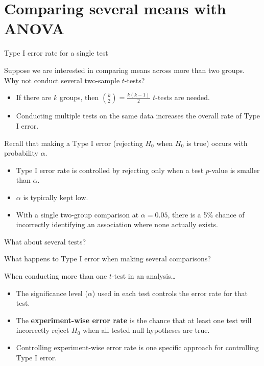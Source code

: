 \documentclass[
  ignorenonframetext,
  aspectratio=169]{beamer}
\begin{document}
\hypertarget{comparing-several-means-with-anova}{%
\section{Comparing several means with
ANOVA}\label{comparing-several-means-with-anova}}

\begin{frame}{Type I error rate for a single test}
\protect\hypertarget{type-i-error-rate-for-a-single-test}{}
\small

Suppose we are interested in comparing means across more than two
groups. Why not conduct several two-sample \(t\)-tests?

\begin{itemize}
\item
  If there are \(k\) groups, then \({k \choose 2} = \frac{k(k-1)}{2}\)
  \(t\)-tests are needed.
\item
  Conducting multiple tests on the same data increases the overall rate
  of Type I error.
\end{itemize}

Recall that making a Type I error (rejecting \(H_0\) when \(H_0\) is
true) occurs with probability \(\alpha\).

\begin{itemize}
\item
  Type I error rate is controlled by rejecting only when a test
  \(p\)-value is smaller than \(\alpha\).
\item
  \(\alpha\) is typically kept low.
\item
  With a single two-group comparison at \(\alpha = 0.05\), there is a
  5\% chance of incorrectly identifying an association where none
  actually exists.
\end{itemize}
\end{frame}

\begin{frame}{What about several tests?}
\protect\hypertarget{what-about-several-tests}{}
\small

What happens to Type I error when making several comparisons?

When conducting more than one \(t\)-test in an analysis\ldots{}

\begin{itemize}
\item
  The significance level (\(\alpha\)) used in each test controls the
  error rate for that test.
\item
  The \textbf{experiment-wise error rate} is the chance that at least
  one test will incorrectly reject \(H_0\) when all tested null
  hypotheses are true.
\item
  Controlling experiment-wise error rate is one specific approach for
  controlling Type I error.
\end{itemize}
\end{frame}
\end{document}
